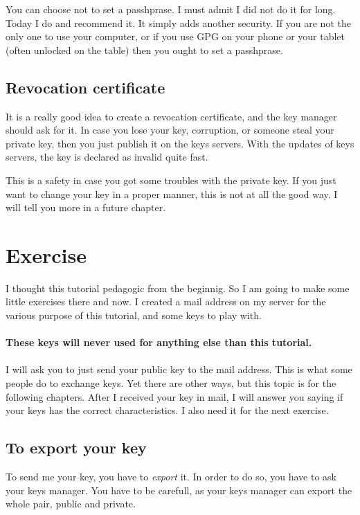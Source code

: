 You can choose not to set a passhprase. I must admit I did not do it for
long. Today I do and recommend it. It simply adds another security. If you are not the only one to use your computer, or if you use GPG on
your phone or your tablet (often unlocked on the table) then you ought
to set a passhprase.

\subsection{Revocation certificate}\label{revocation-certificate}

It is a really good idea to create a revocation certificate, and the key
manager should ask for it. In case you lose your key, corruption, or someone steal your private
key, then you just publish it on the keys servers. With the updates of
keys servers, the key is declared as invalid quite fast.

This is a safety in case you got some troubles with the private key. If you just want to change your key in a proper manner, this is not at
all the good way. I will tell you more in a future chapter.

\section{Exercise}\label{exercise}

I thought this tutorial pedagogic from the beginnig. So I am going to
make some little exercises there and now. I created a mail address on my
server for the various purpose of this tutorial, and some keys to play
with.\\
\\
\textbf{These keys will never used for anything else than this tutorial.}\\
\\
I will ask you to just send your public key to the mail address. This is
what some people do to exchange keys. Yet there are other ways, but this
topic is for the following chapters. After I received your key in mail, I will answer you saying if your keys
has the correct characteristics. I also need it for the next exercise.

\subsection{To export your key}\label{to-export-your-key}

To send me your key, you have to \emph{export} it. In order to do so, you have to ask your keys manager. You have to be carefull, as your keys manager can export the whole pair, public and private.

